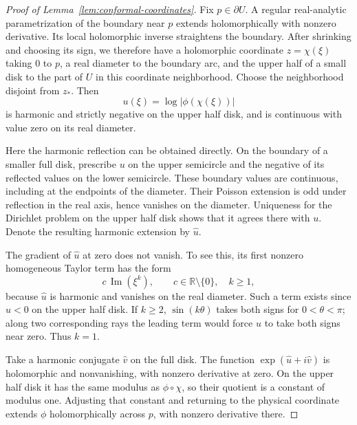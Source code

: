 \documentclass[11pt]{article}
\newcommand{\R}{\mathbb R}
\theoremstyle{definition}
\theoremstyle{remark}
\numberwithin{equation}{section}
\begin{document}
\begin{proof}[Proof of Lemma~\ref{lem:conformal-coordinates}]
Fix $p\in\partial U$. A regular real-analytic parametrization of the
boundary near $p$ extends holomorphically with nonzero derivative. Its
local holomorphic inverse straightens the boundary. After shrinking and
choosing its sign, we therefore have a holomorphic coordinate
$z=\chi(\xi)$ taking $0$ to $p$, a real diameter to the boundary arc, and
the upper half of a small disk to the part of $U$ in this coordinate
neighborhood. Choose the neighborhood disjoint from $z_*$. Then
\[
 u(\xi)=\log|\phi(\chi(\xi))|
\]
is harmonic and strictly negative on the upper half disk, and is
continuous with value zero on its real diameter.

Here the harmonic reflection can be obtained directly. On the boundary
of a smaller full disk, prescribe $u$ on the upper semicircle and the
negative of its reflected values on the lower semicircle. These boundary
values are continuous, including at the endpoints of the diameter.
Their Poisson extension is odd under reflection in the real axis, hence
vanishes on the diameter. Uniqueness for the Dirichlet problem on the
upper half disk shows that it agrees there with $u$. Denote the resulting
harmonic extension by $\widehat u$.

The gradient of $\widehat u$ at zero does not vanish. To see this, its
first nonzero homogeneous Taylor term has the form
\[
 c\,\operatorname{Im}(\xi^k),\qquad c\in\R\setminus\{0\},\quad k\ge1,
\]
because $\widehat u$ is harmonic and vanishes on the real diameter.
Such a term exists since $u<0$ on the upper half disk. If $k\ge2$,
$\sin(k\theta)$ takes both signs for $0<\theta<\pi$; along two
corresponding rays the leading term would force $u$ to take both signs
near zero. Thus $k=1$.

Take a harmonic conjugate $\widehat v$ on the full disk. The function
$\exp(\widehat u+i\widehat v)$ is holomorphic and nonvanishing, with
nonzero derivative at zero. On the upper half disk it has the same
modulus as $\phi\circ\chi$, so their quotient is a constant of modulus
one. Adjusting that constant and returning to the physical coordinate
extends $\phi$ holomorphically across $p$, with nonzero derivative there.


\end{proof}
\end{document}
